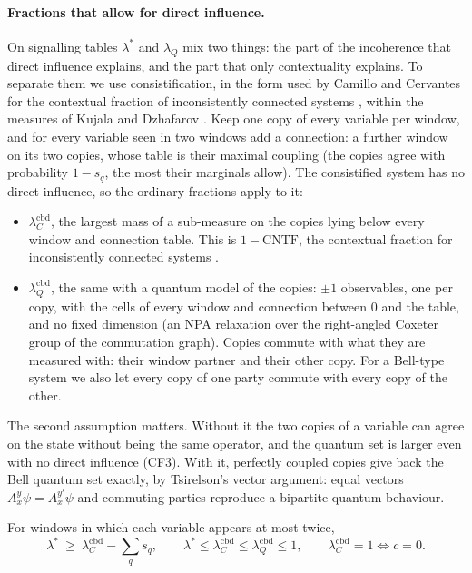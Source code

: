 \documentclass[11pt]{article}
\theoremstyle{definition}\newtheorem{definition}[theorem]{Definition}\newtheorem{remark}[theorem]{Remark}\newtheorem{example}[theorem]{Example}
\begin{document}
\paragraph{Fractions that allow for direct influence.}
On signalling tables $\lambda^*$ and $\lambda_Q$ mix two things: the part of the incoherence that direct influence explains, and the part
that only contextuality explains. To separate them we use consistification, in the form used by Camillo and Cervantes for the contextual fraction of
inconsistently connected systems \cite{CamilloCervantes2023}, within the measures of Kujala and Dzhafarov \cite{KujalaDzhafarov2019}. Keep one copy of every variable per window, and for every variable seen in two
windows add a connection: a further window on its two copies, whose table is their maximal coupling (the copies agree with probability
$1-s_q$, the most their marginals allow). The consistified system has no direct influence, so the ordinary fractions apply to it:
\begin{itemize}
\item $\lambda_C^{\mathrm{cbd}}$, the largest mass of a sub-measure on the copies lying below every window and connection table. This is
  $1-\mathrm{CNTF}$, the contextual fraction for inconsistently connected systems \cite{CamilloCervantes2023}.
\item $\lambda_Q^{\mathrm{cbd}}$, the same with a quantum model of the copies: $\pm1$ observables, one per copy, with the cells of every
  window and connection between $0$ and the table, and no fixed dimension (an NPA relaxation over the right-angled Coxeter group of the
  commutation graph). Copies commute with what they are measured with: their window partner and their other copy. For a Bell-type system
  we also let every copy of one party commute with every copy of the other.
\end{itemize}
The second assumption matters. Without it the two copies of a variable can agree on the state without being the same operator, and the
quantum set is larger even with no direct influence (CF3). With it, perfectly coupled copies give back the Bell quantum set exactly, by
Tsirelson's vector argument: equal vectors $A^y_x\psi=A^{y'}_x\psi$ and commuting parties reproduce a bipartite quantum behaviour.

\begin{proposition}\label{prop:dibound}
For windows in which each variable appears at most twice,
\[\lambda^*\ \ge\ \lambda_C^{\mathrm{cbd}}-\textstyle\sum_q s_q ,\qquad \lambda^*\le\lambda_C^{\mathrm{cbd}}\le\lambda_Q^{\mathrm{cbd}}\le1,\qquad
\lambda_C^{\mathrm{cbd}}=1\iff c=0 .\]
\end{proposition}
\end{document}
